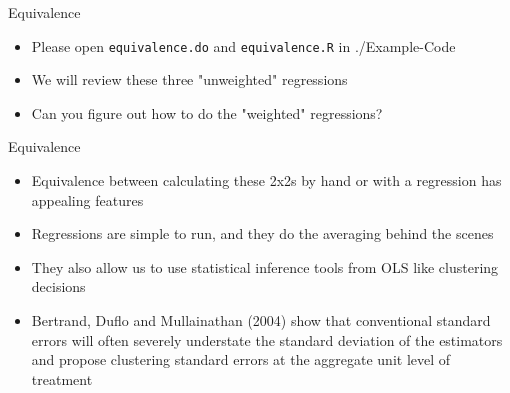 \documentclass{beamer}
\begin{document}
\begin{frame}{Equivalence}

\begin{itemize}
\item Please open \texttt{equivalence.do} and \texttt{equivalence.R} in ./Example-Code
\item We will review these three "unweighted" regressions
\item Can you figure out how to do the "weighted" regressions?

\end{itemize}

\end{frame}


\begin{frame}{Equivalence}

\begin{itemize}

\item Equivalence between calculating these 2x2s by hand or with a regression has appealing features
\item Regressions are simple to run, and they do the averaging behind the scenes
\item They also allow us to use statistical inference tools from OLS like clustering decisions
\item  Bertrand, Duflo and Mullainathan (2004) show that conventional standard errors will often severely understate the standard deviation of the estimators and propose clustering standard errors at the aggregate unit level of treatment
\end{itemize}

\end{frame}
\end{document}
